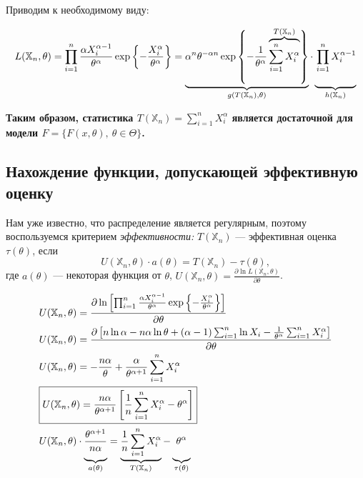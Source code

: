 \documentclass[12pt]{article}
\begin{document}
Приводим к необходимому виду:

$$
\begin{aligned}
	L(\mathbb{X}_n, \theta) = \prod_{i=1}^{n} \frac{\alpha X_i^{\alpha-1}}{\theta^\alpha} \exp\left\{-\frac{X_i^\alpha}{\theta^\alpha}\right\} = \underbrace{\alpha^n \theta^{-\alpha n} \exp\left\{-\frac{1}{\theta^\alpha}\overbrace{\sum_{i=1}^n X_i^\alpha}^{T(\mathbb{X}_n)}\right\}}_{g(T(\mathbb{X}_n), \theta)} \cdot \underbrace{\vphantom{
	\alpha^n \theta^{-\alpha n} \exp\left\{-\frac{1}{\theta^\alpha}\overbrace{\sum_{i=1}^n X_i^\alpha}^{T(\mathbb{X}_n)}\right\}
}\prod_{i=1}^n X_i^{\alpha-1}}_{h(\mathbb{X}_n)}
\end{aligned}
$$

\begin{center}
\textbf{Таким образом, статистика $T(\mathbb{X}_n) = \sum_{i=1}^n X_i^\alpha $ является достаточной для модели $F=\{F(x, \theta),\ \theta\in\Theta\}$.}
\end{center}

\subsection{Нахождение функции, допускающей эффективную оценку}

Нам уже известно, что распределение является регулярным, поэтому воспользуемся критерием \textit{эффективности:} $T(\mathbb{X}_n)$ --- эффективная оценка $\tau(\theta)$, если 
$$
	U(\mathbb{X}_n, \theta)\cdot a(\theta) = T(\mathbb{X}_n) - \tau(\theta),
$$
где $a(\theta)$ --- некоторая функция от $\theta$, $U(\mathbb{X}_n, \theta) = \frac{\partial \ln L(\mathbb{X}_n, \theta)}{\partial \theta}$.

\begin{align}
	&U(\mathbb{X}_n, \theta) = \frac{\partial \ln\left[\prod_{i=1}^{n} \frac{\alpha X_i^{\alpha-1}}{\theta^\alpha} \exp\left\{-\frac{X_i^\alpha}{\theta^\alpha}\right\}\right]}{\partial \theta} \notag\\
	&U(\mathbb{X}_n, \theta) = \frac{\partial \left[n\ln\alpha - n\alpha\ln \theta + (\alpha-1)\sum_{i=1}^n \ln X_i - \frac{1}{\theta^\alpha}\sum_{i=1}^n X_i^\alpha\right]}{\partial \theta} \notag\\
	&U(\mathbb{X}_n, \theta) = -\frac{n\alpha}{\theta} + \frac{\alpha}{\theta^{\alpha+1}}\sum_{i=1}^n X_i^\alpha \notag\\
	&\boxed{U(\mathbb{X}_n, \theta) = \frac{n\alpha}{\theta^{\alpha+1}}\left[\frac{1}{n}\sum_{i=1}^n X_i^\alpha - \theta^\alpha \right]}\label{u} \\
	&U(\mathbb{X}_n, \theta) \cdot \underbrace{\vphantom{\frac{1}{n}\sum_{i=1}^n X_i^\alpha} \frac{\theta^{\alpha+1}}{n\alpha}}_{a(\theta)} = \underbrace{\frac{1}{n}\sum_{i=1}^n X_i^\alpha}_{T(\mathbb{X}_n)} - \underbrace{\vphantom{\frac{1}{n}\sum_{i=1}^n X_i^\alpha} \theta^\alpha}_{\tau(\theta)} \notag
\end{align}
\end{document}
